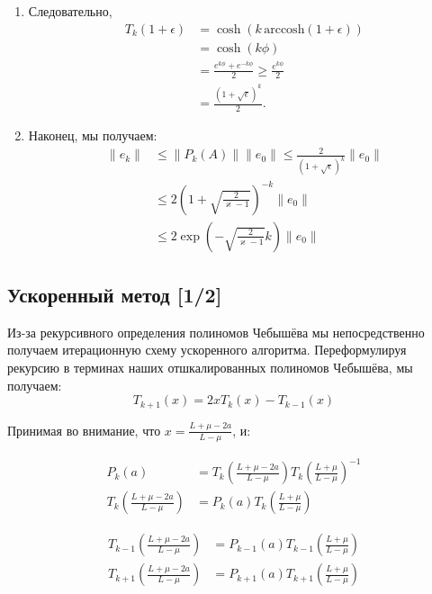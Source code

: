 \documentclass[
  russian,
  letterpaper,
  DIV=11,
  numbers=noendperiod]{scrartcl}
\begin{document}
\begin{enumerate}
\def\labelenumi{\arabic{enumi}.}
\setcounter{enumi}{3}
\item
  Следовательно, \[
   \begin{aligned}
   T_k(1+\epsilon)&=\cosh\left(k\,\mathrm{arccosh}(1+\epsilon)\right) \\
   &= \cosh\left(k\phi\right) \\
   &= \frac{e^{k\phi} + e^{-k\phi}}{2} \geq\frac{e^{k\phi}}{2} \\
   &= \frac{\left(1+\sqrt{\epsilon}\right)^k}{2}.
   \end{aligned}
   \]
\item
  Наконец, мы получаем: \[
   \begin{aligned}
   \|e_k\| &\leq \|P_k(A)\| \|e_0\| \leq \frac{2}{\left(1 + \sqrt{\epsilon}\right)^k} \|e_0\| \\ 
   &\leq 2 \left(1 + \sqrt{\frac{2}{\varkappa-1}}\right)^{-k} \|e_0\| \\
   &\leq 2 \exp\left( - \sqrt{\frac{2}{\varkappa-1}} k\right) \|e_0\|
   \end{aligned}
   \]
\end{enumerate}

\subsection{Ускоренный метод
{[}1/2{]}}\label{ux443ux441ux43aux43eux440ux435ux43dux43dux44bux439-ux43cux435ux442ux43eux434-12}

Из-за рекурсивного определения полиномов Чебышёва мы непосредственно
получаем итерационную схему ускоренного алгоритма. Переформулируя
рекурсию в терминах наших отшкалированных полиномов Чебышёва, мы
получаем: \[
T_{k+1}(x) =2xT_{k}(x)-T_{k-1}(x)
\]

Принимая во внимание, что \(x = \frac{L+\mu-2a}{L-\mu}\), и:

\[
\begin{aligned}
P_k(a) &= T_k\left(\frac{L+\mu-2a}{L-\mu}\right) T_k\left(\frac{L+\mu}{L-\mu}\right)^{-1}  \\
T_k\left(\frac{L+\mu-2a}{L-\mu}\right) &= P_k(a) T_k\left(\frac{L+\mu}{L-\mu}\right) 
\end{aligned}
\]

\[
\begin{aligned}
T_{k-1}\left(\frac{L+\mu-2a}{L-\mu}\right) &= P_{k-1}(a) T_{k-1}\left(\frac{L+\mu}{L-\mu}\right) \\
T_{k+1}\left(\frac{L+\mu-2a}{L-\mu}\right) &= P_{k+1}(a) T_{k+1}\left(\frac{L+\mu}{L-\mu}\right)
\end{aligned}
\]
\end{document}
